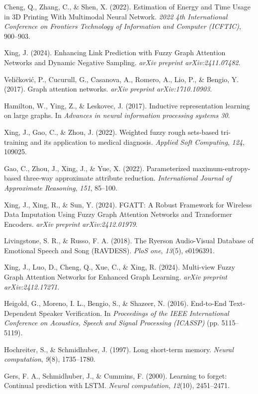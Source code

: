 \documentclass{article}
\begin{document}
\begin{thebibliography}{99}
 Cheng, Q., Zhang, C., \& Shen, X. (2022). Estimation of Energy and Time Usage in 3D Printing With Multimodal Neural Network. \textit{2022 4th International Conference on Frontiers Technology of Information and Computer (ICFTIC)}, 900–903.

 Xing, J. (2024). Enhancing Link Prediction with Fuzzy Graph Attention Networks and Dynamic Negative Sampling. \textit{arXiv preprint arXiv:2411.07482}.

 Veličković, P., Cucurull, G., Casanova, A., Romero, A., Lio, P., \& Bengio, Y. (2017). Graph attention networks. \textit{arXiv preprint arXiv:1710.10903}.

 Hamilton, W., Ying, Z., \& Leskovec, J. (2017). Inductive representation learning on large graphs. In \textit{Advances in neural information processing systems 30}.

 Xing, J., Gao, C., \& Zhou, J. (2022). Weighted fuzzy rough sets-based tri-training and its application to medical diagnosis. \textit{Applied Soft Computing}, \textit{124}, 109025.

 Gao, C., Zhou, J., Xing, J., \& Yue, X. (2022). Parameterized maximum-entropy-based three-way approximate attribute reduction. \textit{International Journal of Approximate Reasoning}, \textit{151}, 85–100.

 Xing, J., Xing, R., \& Sun, Y. (2024). FGATT: A Robust Framework for Wireless Data Imputation Using Fuzzy Graph Attention Networks and Transformer Encoders. \textit{arXiv preprint arXiv:2412.01979}.

 Livingstone, S. R., \& Russo, F. A. (2018). The Ryerson Audio-Visual Database of Emotional Speech and Song (RAVDESS). \textit{PloS one}, \textit{13}(5), e0196391.

 Xing, J., Luo, D., Cheng, Q., Xue, C., \& Xing, R. (2024). Multi-view Fuzzy Graph Attention Networks for Enhanced Graph Learning. \textit{arXiv preprint arXiv:2412.17271}.

 Heigold, G., Moreno, I. L., Bengio, S., \& Shazeer, N. (2016). End-to-End Text-Dependent Speaker Verification. In \textit{Proceedings of the IEEE International Conference on Acoustics, Speech and Signal Processing (ICASSP)} (pp. 5115–5119).

 Hochreiter, S., \& Schmidhuber, J. (1997). Long short-term memory. \textit{Neural computation}, \textit{9}(8), 1735–1780.

 Gers, F. A., Schmidhuber, J., \& Cummins, F. (2000). Learning to forget: Continual prediction with LSTM. \textit{Neural computation}, \textit{12}(10), 2451–2471.


\end{thebibliography}
\end{document}
